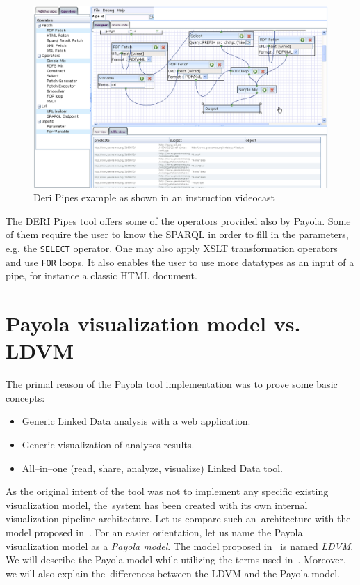 \begin{figure}
	\centering
	\includegraphics[width=140mm]{img/deri.png}
	\caption{Deri Pipes example as shown in an instruction videocast~\cite{deri-screen-source}}
	\label{fig:deri}
\end{figure}

The DERI Pipes tool offers some of the operators provided also by Payola. Some 
of them require the user to know the SPARQL in order to fill in the 
parameters, e.g. the \texttt{SELECT} operator. One may also apply XSLT 
transformation operators and use \texttt{FOR} loops. It also enables the user to use more datatypes as an input 
of a pipe, for instance a classic HTML document.

\section{Payola visualization model vs. LDVM}
The primal reason of the Payola tool implementation was to prove some basic concepts:

\begin{itemize}
\item Generic Linked Data analysis with a web application.
\item Generic visualization of analyses results.
\item All--in--one (read, share, analyze, visualize) Linked Data tool.
\end{itemize}

As the original intent of the tool was not to implement any specific existing visualization model,
the~system has been created with its own internal visualization pipeline architecture. Let us compare such
an~architecture with the model proposed in~\cite{ldvm}. For an easier orientation, let us name the Payola visualization 
model as a \emph{Payola model}. The model proposed in~\cite{ldvm} is named \emph{LDVM}. We will describe the Payola
model while utilizing the terms used in~\cite{ldvm}. Moreover, we will also explain
the~differences between the LDVM and the Payola model.

